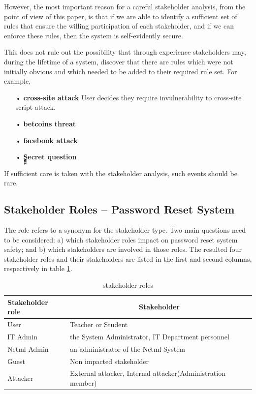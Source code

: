 However, the most important reason for a careful stakeholder analysis, from
the point of view of this paper, is that if we are able to identify a sufficient
set of rules that ensure the willing participation of each stakeholder, and 
if we can enforce these rules, then the system is self-evidently secure. 

This does not rule out the possibility that through experience stakeholders may, during the lifetime of a system, discover that there are rules which were not initially obvious and which needed to be added to their required rule set. For example, 
\begin{itemize}
\item[•] \textbf{cross-site attack} User decides they require invulnerability to cross-site script attack.
\item[•] \textbf{betcoins threat} 
\item[•] \textbf{facebook attack} 
\item[•] \textbf{ٍٍٍSecret question} 

\end{itemize}


 If sufficient care is taken with the stakeholder analysis, such events should be rare.



\subsection{Stakeholder Roles -- Password Reset System}\label{Stakeholder Role}

The role refers to a synonym for the stakeholder type. Two main questions
need to be considered: a) which stakeholder roles impact on password
reset system safety; and b) which stakeholders are involved in those
roles. The  resulted four stakeholder roles and their stakeholders
are listed in the first and second columns, respectively in table
\ref{Stkroles}.

 \begin{table}[!htbp]	      %
	\begin{center}
\begin{tabular}{|l|p{5.5cm}|} \hline
 \textbf{Stakeholder role} & \multicolumn{1}{|c|}{\textbf{Stakeholder}} \\
\hline
 User & Teacher or Student \\
\hline
 IT Admin &  the System Administrator, IT Department personnel \\
\hline
 Netml Admin &  an administrator of the Netml System \\
\hline Guest & Non impacted stakeholder \\
\hline
 Attacker & External attacker, Internal attacker(Administration member) \\
\hline
	\end{tabular} \end{center} \caption{ stakeholder roles }
\label{Stkroles} \end{table}

